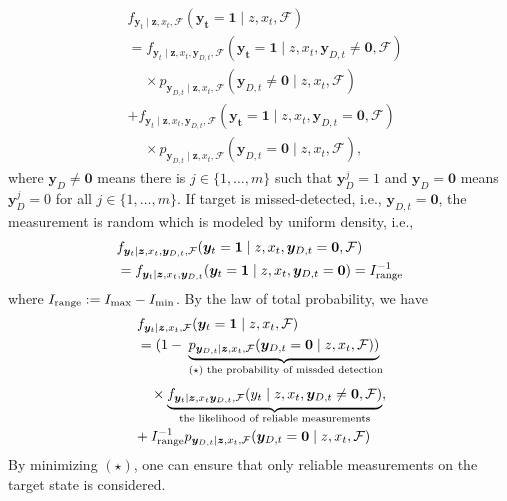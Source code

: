 \documentclass[letterpaper, 10 pt, conference]{ieeeconf}
\begin{document}
\begin{align*}
&f_{\bm{y}_t \mid \bm{z},x_{t},\mathcal{F}}(\bm{y_t}=\bm{1} \mid z,x_{t},\mathcal{F}) \\
&=f_{\bm{y}_t \mid \bm{z},x_{t},\bm{y}_{D,t},\mathcal{F}}(\bm{y_t}=\bm{1} \mid z,x_{t},\bm{y}_{D,t} \neq \mathbf{0},\mathcal{F}) \\ 
&\,\,\,\,\,\,\,\times p_{\bm{y}_{D,t} \mid \bm{z},x_{t},\mathcal{F}}(\bm{y}_{D,t} \neq \mathbf{0} \mid z,x_{t},\mathcal{F}) \nonumber\\
&+f_{\bm{y}_t \mid \bm{z},x_{t},\bm{y}_{D,t},\mathcal{F}}(\bm{y_t}=\bm{1} \mid z,x_{t},\bm{y}_{D,t}=\mathbf{0},\mathcal{F}) \\
&\,\,\,\,\,\,\,\times p_{\bm{y}_{D,t} \mid \bm{z},x_{t},\mathcal{F}}(\bm{y}_{D,t} =\mathbf{0} \mid z,x_{t},\mathcal{F}), \nonumber
\end{align*}
where $\bm{y}_D \neq \mathbf{0}$ means there is $j \in \lbrace 1,\dots,m \rbrace$ such that $\bm{y}_D^j = 1$ and $\bm{y}_D = \mathbf{0}$ means $\bm{y}_D^j = 0$ for all $j \in \lbrace 1,\dots,m \rbrace$. 
If target is missed-detected, i.e., $\bm{y}_{D,t} =\bm{0}$, the measurement is random which is modeled by uniform density, i.e.,
\begin{align*}
&f_{\bm{y}_t \mid \bm{z},x_{t},\bm{y}_{D,t},\mathcal{F}}(\bm{y}_t = \bm{1} \mid z,x_{t},\bm{y}_{D,t}=\mathbf{0},\mathcal{F}) \\
&=f_{\bm{y}_t \mid \bm{z},x_{t},\bm{y}_{D,t}}(\bm{y}_t = \bm{1} \mid z,x_{t},\bm{y}_{D,t}=\mathbf{0})= I_{\textup{range}}^{-1}
\end{align*}
where $I_{\textup{range}} := I_{\max} - I_{\min}$. By the law of total probability, we have
\begin{align}
&f_{\bm{y}_t \mid \bm{z},x_{t},\mathcal{F}}(\bm{y}_t = \bm{1} \mid z,x_{t},\mathcal{F}) \nonumber \\
&=(1-
\underbrace{
p_{\bm{y}_{D,t} \mid \bm{z},x_{t},\mathcal{F}}(\bm{y}_{D,t} = \mathbf{0} \mid z,x_{t},\mathcal{F}))}_{\textup{ }(\star) \textup{ the probability of missded detection}} \nonumber 
\end{align}
\begin{align}
&\,\,\,\,\,\,\,\times \underbrace{f_{\bm{y}_t \mid \bm{z},x_{t}\bm{y}_{D,t},\mathcal{F}}(y_t \mid z,x_{t},\bm{y}_{D,t}\neq \mathbf{0},\mathcal{F})}_{\textup{the likelihood of reliable measurements}}, \nonumber \\
&+I_{\textup{range}}^{-1}p_{\bm{y}_{D,t} \mid \bm{z},x_{t},\mathcal{F}}(\bm{y}_{D,t} = \mathbf{0} \mid z,x_{t},\mathcal{F})
\label{eq10}
\end{align}
By minimizing $(\star)$, one can ensure that only reliable measurements on the target state is considered. 
\end{document}
